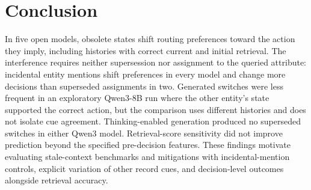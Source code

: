 \section{Conclusion}
\label{sec:conclusion}

In five open models, obsolete states shift routing preferences toward the action they imply, including
histories with correct current and initial retrieval. The interference requires neither supersession
nor assignment to the queried attribute: incidental entity mentions shift preferences in every model
and change more decisions than superseded assignments in two. Generated switches were less frequent
in an exploratory Qwen3-8B run where the other entity's state supported the correct action, but the
comparison uses different histories and does not isolate cue agreement. Thinking-enabled generation
produced no superseded switches in either Qwen3 model. Retrieval-score sensitivity did not improve
prediction beyond the specified pre-decision features. These findings motivate evaluating stale-context
benchmarks and mitigations with incidental-mention controls, explicit variation of other record cues,
and decision-level outcomes alongside retrieval accuracy. \modelcountconclusion
\label{end-of-main}
